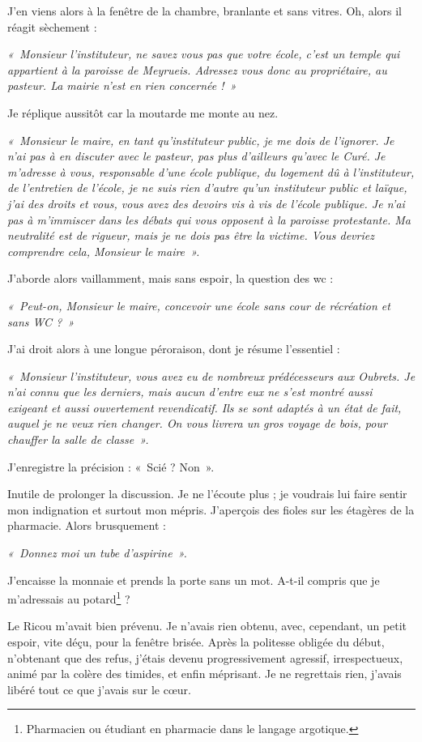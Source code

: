 J’en viens alors à la fenêtre de la chambre, branlante et sans vitres. Oh, alors il réagit
sèchement :

\textit{«~Monsieur l’instituteur, ne savez vous pas que votre école, c’est un temple qui
appartient à la paroisse de Meyrueis. Adressez vous donc au propriétaire, au pasteur.
La mairie n’est en rien concernée !~»}

Je réplique aussitôt car la moutarde me monte au nez.

\textit{«~Monsieur le maire, en tant qu’instituteur public, je me dois de l’ignorer. Je n’ai pas
à en discuter avec le pasteur, pas plus d’ailleurs qu’avec le Curé. Je m’adresse à
vous, responsable d’une école publique, du logement dû à l’instituteur, de l’entretien
de l’école, je ne suis rien d’autre qu’un instituteur public et laïque, j’ai des droits et
vous, vous avez des devoirs vis à vis de l’école publique. Je n’ai pas à m’immiscer
dans les débats qui vous opposent à la paroisse protestante. Ma neutralité est de
rigueur, mais je ne dois pas être la victime. Vous devriez comprendre cela, Monsieur
le maire~».}

J’aborde alors vaillamment, mais sans espoir, la question des wc :

\textit{«~Peut-on, Monsieur le maire, concevoir une école sans cour de récréation et sans WC ?~»}

J’ai droit alors à une longue péroraison, dont je résume l’essentiel :

\textit{«~Monsieur l’instituteur, vous avez eu de nombreux prédécesseurs aux Oubrets. Je
n’ai connu que les derniers, mais aucun d’entre eux ne s’est montré aussi exigeant et
aussi ouvertement revendicatif. Ils se sont adaptés à un état de fait, auquel je ne veux
rien changer.
On vous livrera un gros voyage de bois, pour chauffer la salle de classe~».}

J’enregistre la précision : «~Scié ? Non~».

Inutile de prolonger la discussion. Je ne l’écoute plus ; je voudrais lui faire sentir mon
indignation et surtout mon mépris. J’aperçois des fioles sur les étagères de la
pharmacie. Alors brusquement :

\textit{«~Donnez moi un tube d’aspirine~».}

J’encaisse la monnaie et prends la porte sans un mot. A-t-il compris que je m’adressais au
potard\footnote{Pharmacien ou étudiant en pharmacie dans le langage argotique.} ?

Le Ricou m’avait bien prévenu. Je n’avais rien obtenu, avec, cependant, un petit espoir, vite
déçu, pour la fenêtre brisée. Après la politesse obligée du début, n’obtenant que des refus,
j’étais devenu progressivement agressif, irrespectueux, animé par la colère des timides, et
enfin méprisant. Je ne regrettais rien, j’avais libéré tout ce que j’avais sur le cœur.


